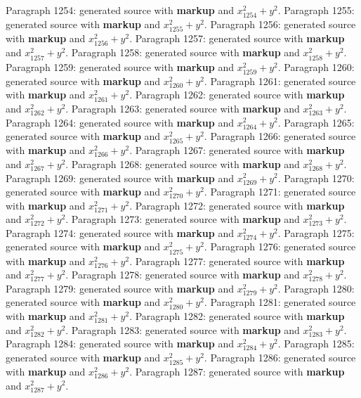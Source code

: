 \documentclass{article}
\begin{document}
Paragraph 1254: generated source with \textbf{markup} and $x_{1254}^2 + y^2$.
Paragraph 1255: generated source with \textbf{markup} and $x_{1255}^2 + y^2$.
Paragraph 1256: generated source with \textbf{markup} and $x_{1256}^2 + y^2$.
Paragraph 1257: generated source with \textbf{markup} and $x_{1257}^2 + y^2$.
Paragraph 1258: generated source with \textbf{markup} and $x_{1258}^2 + y^2$.
Paragraph 1259: generated source with \textbf{markup} and $x_{1259}^2 + y^2$.
Paragraph 1260: generated source with \textbf{markup} and $x_{1260}^2 + y^2$.
Paragraph 1261: generated source with \textbf{markup} and $x_{1261}^2 + y^2$.
Paragraph 1262: generated source with \textbf{markup} and $x_{1262}^2 + y^2$.
Paragraph 1263: generated source with \textbf{markup} and $x_{1263}^2 + y^2$.
Paragraph 1264: generated source with \textbf{markup} and $x_{1264}^2 + y^2$.
Paragraph 1265: generated source with \textbf{markup} and $x_{1265}^2 + y^2$.
Paragraph 1266: generated source with \textbf{markup} and $x_{1266}^2 + y^2$.
Paragraph 1267: generated source with \textbf{markup} and $x_{1267}^2 + y^2$.
Paragraph 1268: generated source with \textbf{markup} and $x_{1268}^2 + y^2$.
Paragraph 1269: generated source with \textbf{markup} and $x_{1269}^2 + y^2$.
Paragraph 1270: generated source with \textbf{markup} and $x_{1270}^2 + y^2$.
Paragraph 1271: generated source with \textbf{markup} and $x_{1271}^2 + y^2$.
Paragraph 1272: generated source with \textbf{markup} and $x_{1272}^2 + y^2$.
Paragraph 1273: generated source with \textbf{markup} and $x_{1273}^2 + y^2$.
Paragraph 1274: generated source with \textbf{markup} and $x_{1274}^2 + y^2$.
Paragraph 1275: generated source with \textbf{markup} and $x_{1275}^2 + y^2$.
Paragraph 1276: generated source with \textbf{markup} and $x_{1276}^2 + y^2$.
Paragraph 1277: generated source with \textbf{markup} and $x_{1277}^2 + y^2$.
Paragraph 1278: generated source with \textbf{markup} and $x_{1278}^2 + y^2$.
Paragraph 1279: generated source with \textbf{markup} and $x_{1279}^2 + y^2$.
Paragraph 1280: generated source with \textbf{markup} and $x_{1280}^2 + y^2$.
Paragraph 1281: generated source with \textbf{markup} and $x_{1281}^2 + y^2$.
Paragraph 1282: generated source with \textbf{markup} and $x_{1282}^2 + y^2$.
Paragraph 1283: generated source with \textbf{markup} and $x_{1283}^2 + y^2$.
Paragraph 1284: generated source with \textbf{markup} and $x_{1284}^2 + y^2$.
Paragraph 1285: generated source with \textbf{markup} and $x_{1285}^2 + y^2$.
Paragraph 1286: generated source with \textbf{markup} and $x_{1286}^2 + y^2$.
Paragraph 1287: generated source with \textbf{markup} and $x_{1287}^2 + y^2$.
\end{document}
